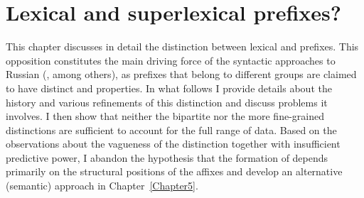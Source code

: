 
\chapter{Lexical and superlexical prefixes?} 
\label{Chapter4}

This chapter discusses in detail the distinction between lexical and  prefixes. This opposition constitutes the main driving force of the syntactic approaches to Russian  (\citealt{Ramchand:04, Svenonius:04b, Romanova:06}, among others), as prefixes that belong to different groups are claimed to have distinct  and properties. In what follows I provide details about the history and various refinements of this distinction and discuss problems it involves. I then show that neither the bipartite nor the more fine-grained distinctions are sufficient to account for the full range of data. Based on the observations about the vagueness of the distinction together with insufficient predictive power, I abandon the hypothesis that the formation of  depends primarily on the structural positions of the affixes and develop an alternative (semantic) approach in Chapter~\ref{Chapter5}.

